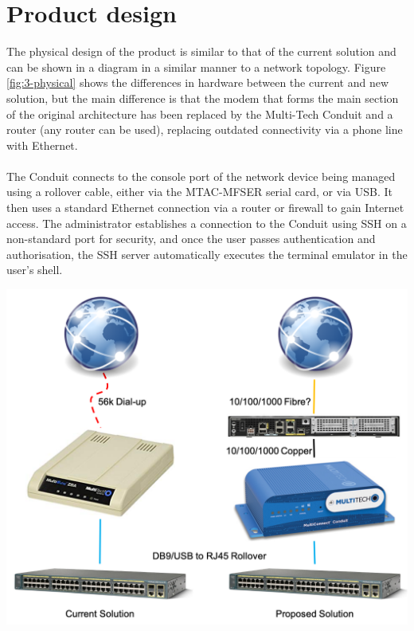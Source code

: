 \section{Product design}
\label{section:design-productdesign}
The physical design of the product is similar to that of the current solution and can be shown in a diagram in a similar manner to a network topology. Figure \ref{fig:3-physical} shows the differences in hardware between the current and new solution, but the main difference is that the modem that forms the main section of the original architecture has been replaced by the Multi-Tech Conduit and a router (any router can be used), replacing outdated connectivity via a phone line with Ethernet.\\\\
The Conduit connects to the console port of the network device being managed using a rollover cable, either via the MTAC-MFSER serial card, or via USB. It then uses a standard Ethernet connection via a router or firewall to gain Internet access. The administrator establishes a connection to the Conduit using SSH on a non-standard port for security, and once the user passes authentication and authorisation, the SSH server automatically executes the terminal emulator in the user's shell.
\begin{center}
    \includegraphics[scale=0.7]{img/3-design/physical.png}
    \label{fig:3-physical}
\end{center}